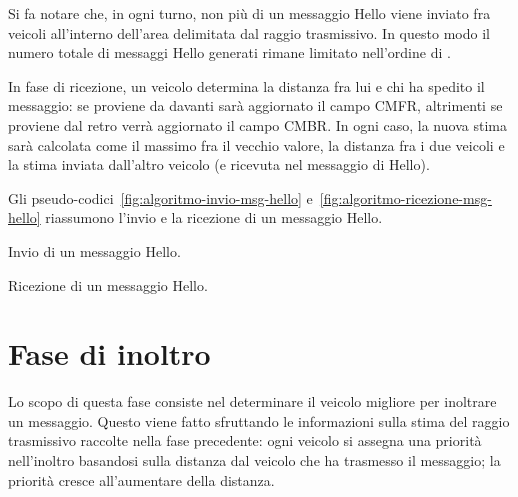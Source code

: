Si fa notare che, in ogni turno, non più di un messaggio Hello viene inviato fra veicoli all'interno dell'area delimitata dal raggio trasmissivo.
In questo modo il numero totale di messaggi Hello generati rimane limitato nell'ordine di .

In fase di ricezione, un veicolo determina la distanza fra lui e chi ha spedito il messaggio: se proviene da davanti sarà aggiornato il campo CMFR,
altrimenti se proviene dal retro verrà aggiornato il campo CMBR.
In ogni caso, la nuova stima sarà calcolata come il massimo fra il vecchio valore, la distanza fra i due veicoli e la stima inviata dall'altro veicolo
(e ricevuta nel messaggio di Hello).

Gli pseudo-codici~\ref{fig:algoritmo-invio-msg-hello} e~\ref{fig:algoritmo-ricezione-msg-hello} riassumono l'invio e la ricezione di un messaggio Hello.
%
\begin{italianalgorithm}[h]
\caption{Invio di un messaggio Hello.}\label{fig:algoritmo-invio-msg-hello}
\begin{algorithmic}[1]
		\EndIf{}
	\EndFor{}
\end{algorithmic}
\end{italianalgorithm}
%
\begin{italianalgorithm}[h]
\caption{Ricezione di un messaggio Hello.}\label{fig:algoritmo-ricezione-msg-hello}
\begin{algorithmic}[1]
\end{algorithmic}
\end{italianalgorithm}
%
\section{Fase di inoltro}\label{sec:fb-fase-inoltro}
Lo scopo di questa fase consiste nel determinare il veicolo migliore per inoltrare un messaggio.
Questo viene fatto sfruttando le informazioni sulla stima del raggio trasmissivo raccolte nella fase precedente:
ogni veicolo si assegna una priorità nell'inoltro basandosi sulla distanza dal veicolo che ha trasmesso il messaggio;
la priorità cresce all'aumentare della distanza.

